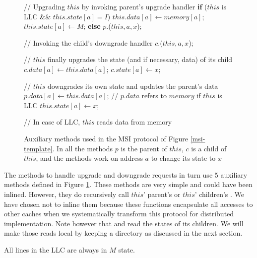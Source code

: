 \begin{figure}
\small

\begin{algorithmic}
\State // Upgrading $this$ by invoking parent's upgrade handler
  \State \textbf{if} ($this$ is LLC \&\& $this.state[a] = I$) \bopen
  \State \;\;\;\; $this.data[a] \gets memory[a]$;
  \State \;\;\;\; $this.state[a] \gets M$;
  \State \bclose \textbf{else}
  \State \;\;\;\; \call{} $p.$\uReq($this, a, x$);  
\EndProc

\State // Invoking the child's downgrade handler
  \State \call{} $c.$\dReq($this, a, x$);
\EndProc

\State // $this$ finally upgrades the state (and if necessary, data) of its child
    \State $c.data[a] \gets this.data[a]$;
  \EndIf
  \State $c.state[a] \gets x$;
\EndProc

\State // $this$ downgrades its own state and updates the parent's data
    \State $p.data[a] \gets this.data[a]$;
    \State // $p.data$ refers to $memory$ if $this$ is LLC
  \EndIf
  \State $this.state[a] \gets x$;
\EndProc

\State // In case of LLC, $this$ reads data from memory
\EndProc
\end{algorithmic}

\caption{Auxiliary methods used in the MSI protocol of Figure \ref{msi-template}. In all the methods $p$ is the parent of $this$, $c$ is a child of $this$, and the methods work on address $a$ to change its state to $x$}
\label{atomic}
\end{figure}

The methods to handle upgrade and downgrade requests in turn use 5 auxiliary methods defined in Figure \ref{atomic}. These methods are very simple and could have been inlined. However, they do recursively call $this$' parent's \uReq{} or $this$' children's \uReq{}. We have chosen not to inline them because these functions encapsulate all accesses to other caches when we systematically transform this protocol for distributed implementation. Note however that \uReq{} and \dReq{} read the states of its children. We will make those reads local by keeping a directory as discussed in the next section.

All lines in the LLC are always in $M$ state.
